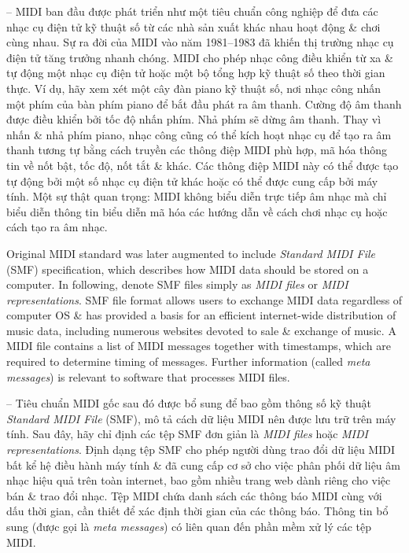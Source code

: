 \documentclass{article}
\begin{document}
\begin{itemize}
\begin{itemize}
\begin{itemize}
			-- MIDI ban đầu được phát triển như một tiêu chuẩn công nghiệp để đưa các nhạc cụ điện tử kỹ thuật số từ các nhà sản xuất khác nhau hoạt động \& chơi cùng nhau. Sự ra đời của MIDI vào năm 1981--1983 đã khiến thị trường nhạc cụ điện tử tăng trưởng nhanh chóng. MIDI cho phép nhạc công điều khiển từ xa \& tự động một nhạc cụ điện tử hoặc một bộ tổng hợp kỹ thuật số theo thời gian thực. Ví dụ, hãy xem xét một cây đàn piano kỹ thuật số, nơi nhạc công nhấn một phím của bàn phím piano để bắt đầu phát ra âm thanh. Cường độ âm thanh được điều khiển bởi tốc độ nhấn phím. Nhả phím sẽ dừng âm thanh. Thay vì nhấn \& nhả phím piano, nhạc công cũng có thể kích hoạt nhạc cụ để tạo ra âm thanh tương tự bằng cách truyền các thông điệp MIDI phù hợp, mã hóa thông tin về nốt bật, tốc độ, nốt tắt \& khác. Các thông điệp MIDI này có thể được tạo tự động bởi một số nhạc cụ điện tử khác hoặc có thể được cung cấp bởi máy tính. Một sự thật quan trọng: MIDI không biểu diễn trực tiếp âm nhạc mà chỉ biểu diễn thông tin biểu diễn mã hóa các hướng dẫn về cách chơi nhạc cụ hoặc cách tạo ra âm nhạc.
			
			Original MIDI standard was later augmented to include {\it Standard MIDI File} (SMF) specification, which describes how MIDI data should be stored on a computer. In following, denote SMF files simply as {\it MIDI files} or {\it MIDI representations}. SMF file format allows users to exchange MIDI data regardless of computer OS \& has provided a basis for an efficient internet-wide distribution of music data, including numerous websites devoted to sale \& exchange of music. A MIDI file contains a list of MIDI messages together with timestamps, which are required to determine timing of messages. Further information (called {\it meta messages}) is relevant to software that processes MIDI files.
			
			-- Tiêu chuẩn MIDI gốc sau đó được bổ sung để bao gồm thông số kỹ thuật {\it Standard MIDI File} (SMF), mô tả cách dữ liệu MIDI nên được lưu trữ trên máy tính. Sau đây, hãy chỉ định các tệp SMF đơn giản là {\it MIDI files} hoặc {\it MIDI representations}. Định dạng tệp SMF cho phép người dùng trao đổi dữ liệu MIDI bất kể hệ điều hành máy tính \& đã cung cấp cơ sở cho việc phân phối dữ liệu âm nhạc hiệu quả trên toàn internet, bao gồm nhiều trang web dành riêng cho việc bán \& trao đổi nhạc. Tệp MIDI chứa danh sách các thông báo MIDI cùng với dấu thời gian, cần thiết để xác định thời gian của các thông báo. Thông tin bổ sung (được gọi là {\it meta messages}) có liên quan đến phần mềm xử lý các tệp MIDI.
			

\end{itemize}
\end{itemize}
\end{itemize}
\end{document}
